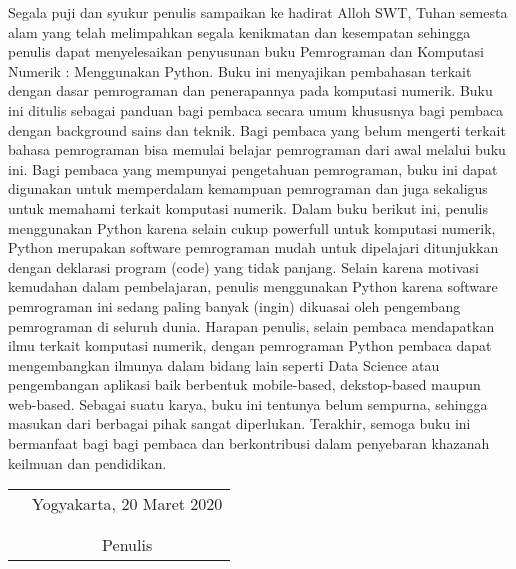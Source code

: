 \preface
Segala puji dan syukur penulis sampaikan ke hadirat Alloh SWT, Tuhan semesta alam yang telah melimpahkan segala kenikmatan dan kesempatan sehingga penulis dapat menyelesaikan penyusunan buku Pemrograman dan Komputasi Numerik : Menggunakan Python.  Buku ini menyajikan pembahasan terkait dengan dasar pemrograman dan penerapannya pada komputasi numerik. Buku ini ditulis sebagai panduan bagi pembaca secara umum khususnya bagi pembaca dengan background sains dan teknik. Bagi pembaca yang belum mengerti terkait bahasa pemrograman bisa memulai belajar pemrograman dari awal melalui buku ini. Bagi pembaca yang mempunyai pengetahuan pemrograman, buku ini dapat digunakan untuk memperdalam kemampuan pemrograman dan juga sekaligus untuk memahami terkait komputasi numerik.  Dalam buku berikut ini, penulis menggunakan Python karena selain cukup powerfull untuk komputasi numerik, Python merupakan software pemrograman mudah untuk dipelajari ditunjukkan dengan deklarasi program (code) yang tidak panjang. Selain karena motivasi kemudahan dalam pembelajaran, penulis menggunakan Python karena software pemrograman ini sedang paling banyak (ingin) dikuasai oleh pengembang pemrograman di seluruh dunia. Harapan penulis, selain pembaca mendapatkan ilmu terkait komputasi numerik, dengan pemrograman Python pembaca dapat mengembangkan ilmunya dalam bidang lain seperti Data Science atau pengembangan aplikasi baik berbentuk mobile-based, 
dekstop-based maupun web-based. Sebagai suatu karya, buku ini tentunya belum sempurna, sehingga masukan dari berbagai pihak sangat diperlukan. Terakhir, semoga buku ini bermanfaat bagi bagi pembaca dan berkontribusi dalam penyebaran khazanah keilmuan dan pendidikan. 

\begin{tabular}{p{7.5cm}c}
&Yogyakarta, 20 Maret 2020\\
\\
&\\
&Penulis
\end{tabular}